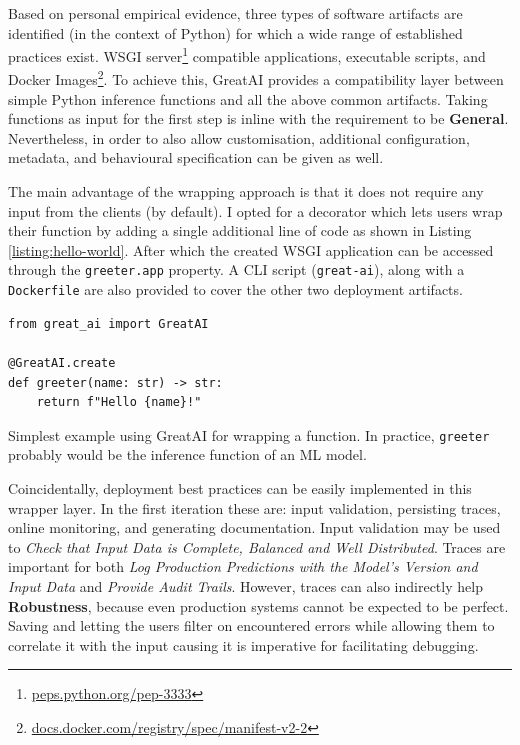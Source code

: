Based on personal empirical evidence, three types of software artifacts are identified (in the context of Python) for which a wide range of established practices exist. WSGI server\footnote{\href{https://peps.python.org/pep-3333/}{peps.python.org/pep-3333}} compatible applications, executable scripts, and Docker Images\footnote{\href{https://docs.docker.com/registry/spec/manifest-v2-2/}{docs.docker.com/registry/spec/manifest-v2-2}}. To achieve this, GreatAI provides a compatibility layer between simple Python inference functions and all the above common artifacts. Taking functions as input for the first step is inline with the requirement to be \textbf{General}. Nevertheless, in order to also allow customisation, additional configuration, metadata, and behavioural specification can be given as well.

The main advantage of the wrapping approach is that it does not require any input from the clients (by default). I opted for a decorator which lets users wrap their function by adding a single additional line of code as shown in Listing \ref{listing:hello-world}.  After which the created WSGI application can be accessed through the \texttt{greeter.app} property. A CLI script (\texttt{great-ai}), along with a \texttt{Dockerfile} are also provided to cover the other two deployment artifacts.

\begin{listing}[!ht]
\begin{verbatim}
from great_ai import GreatAI

@GreatAI.create
def greeter(name: str) -> str:
    return f"Hello {name}!"
\end{verbatim}
\caption{Simplest example using GreatAI for wrapping a function. In practice, \texttt{greeter} probably would be the inference function of an ML model.}
\label{listing:hello-world}
\end{listing}

Coincidentally, deployment best practices can be easily implemented in this wrapper layer. In the first iteration these are: input validation, persisting traces, online monitoring, and generating documentation. Input validation may be used to \textit{Check that Input Data is Complete, Balanced and Well Distributed}. Traces are important for both \textit{Log Production Predictions with the Model's Version and Input Data} and \textit{Provide Audit Trails}. However, traces can also indirectly help \textbf{Robustness}, because even production systems cannot be expected to be perfect. Saving and letting the users filter on encountered errors while allowing them to correlate it with the input causing it is imperative for facilitating debugging.

